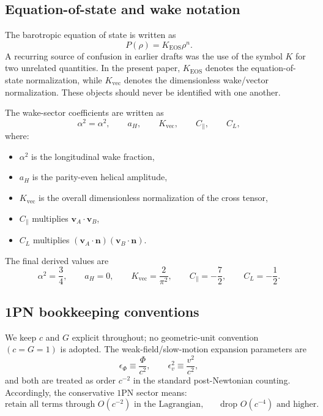 \documentclass[11pt]{article}
\newcommand{\vct}{\mathbf v}
\newcommand{\nvec}{\mathbf n}
\newcommand{\Kvec}{K_{\mathrm{vec}}}
\newcommand{\KEOS}{K_{\mathrm{EOS}}}
\newcommand{\alphaSq}{\alpha^2}
\newcommand{\PhiN}{\Phi}
\newcommand{\Cpara}{C_{\parallel}}
\newcommand{\CLong}{C_{L}}
\begin{document}
\subsection{Equation-of-state and wake notation}
\label{app:notation-eos-wake}

The barotropic equation of state is written as
\begin{equation}
P(\rho)=\KEOS \rho^n.
\label{eq:notation-eos}
\end{equation}
A recurring source of confusion in earlier drafts was the use of the symbol \(K\) for two
unrelated quantities. In the present paper, \(\KEOS\) denotes the equation-of-state
normalization, while \(\Kvec\) denotes the dimensionless wake/vector normalization.
These objects should never be identified with one another.

The wake-sector coefficients are written as
\begin{equation}
\alphaSq=\alpha^2,
\qquad
a_H,
\qquad
\Kvec,
\qquad
\Cpara,
\qquad
\CLong,
\label{eq:notation-wake-symbols}
\end{equation}
where:
\begin{itemize}[leftmargin=1.5em]
  \item \(\alphaSq\) is the longitudinal wake fraction,
  \item \(a_H\) is the parity-even helical amplitude,
  \item \(\Kvec\) is the overall dimensionless normalization of the cross tensor,
  \item \(\Cpara\) multiplies \(\vct_A\!\cdot\!\vct_B\),
  \item \(\CLong\) multiplies
  \((\vct_A\!\cdot\!\nvec)(\vct_B\!\cdot\!\nvec)\).
\end{itemize}
The final derived values are
\begin{equation}
\alphaSq=\frac34,
\qquad
a_H=0,
\qquad
\Kvec=\frac{2}{\pi^2},
\qquad
\Cpara=-\frac72,
\qquad
\CLong=-\frac12.
\label{eq:notation-wake-final-values}
\end{equation}

\subsection{1PN bookkeeping conventions}
\label{app:notation-pn}

We keep \(c\) and \(G\) explicit throughout; no geometric-unit convention
\((c=G=1)\) is adopted. The weak-field/slow-motion expansion parameters are
\begin{equation}
\epsilon_\Phi \equiv \frac{\PhiN}{c^2},
\qquad
\epsilon_v^2 \equiv \frac{v^2}{c^2},
\label{eq:notation-epsilons}
\end{equation}
and both are treated as order \(c^{-2}\) in the standard post-Newtonian counting.
Accordingly, the conservative \(1\)PN sector means:
\begin{equation}
\text{retain all terms through } O(c^{-2}) \text{ in the Lagrangian,}
\qquad
\text{drop } O(c^{-4}) \text{ and higher.}
\label{eq:notation-pn-counting}
\end{equation}
\end{document}
